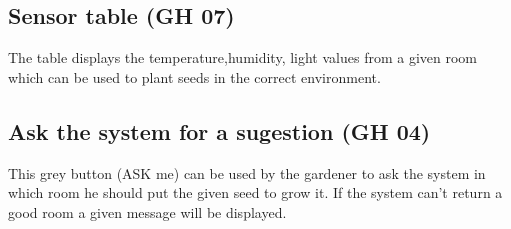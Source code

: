 \subsection{Sensor table (GH 07)}
The table displays the temperature,humidity, light  values from a given room
which can be used to plant seeds in the correct environment.

\subsection{Ask the system for a sugestion (GH 04) }
This grey button (ASK me) can be used by the gardener to ask the system in which
room he should put the given seed to grow it. If the system can't return a good
room a given message will be displayed.
